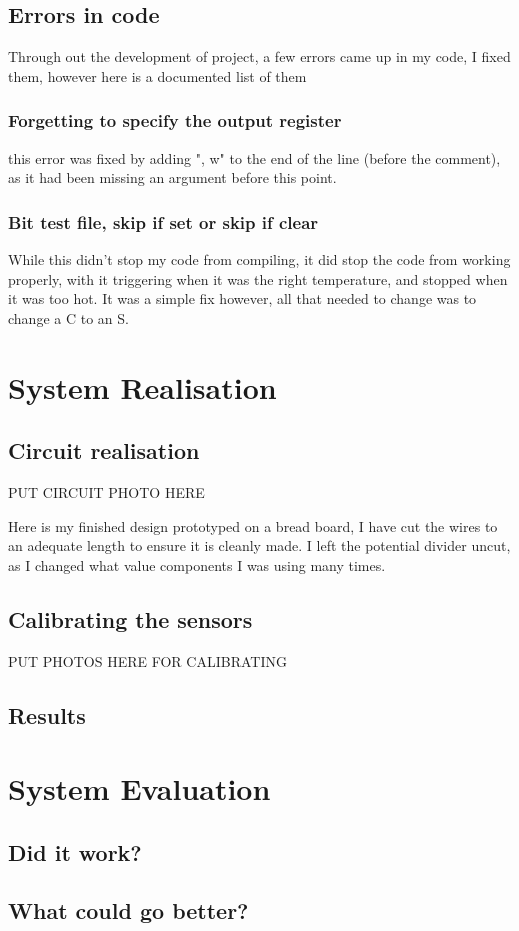 \documentclass[a4paper,12pt]{article}
\begin{document}
{	\subsection{Errors in code}
	Through out the development of project, a few errors came up in my code, I fixed them, however here is a documented
	list of them
	\subsubsection{Forgetting to specify the output register}
	 
	this error was fixed by adding ", w" to the end of the line (before the comment), as it had been missing an argument 
	before this point.
	\subsubsection{Bit test file, skip if set or skip if clear}
	While this didn't stop my code from compiling, it did stop the code from working properly, with it triggering when it
	was the right temperature, and stopped when it was too hot. It was a simple fix however, all that needed to change
	was to change a C to an S.

	\section{System Realisation} 
	\subsection{Circuit realisation}
	PUT CIRCUIT PHOTO HERE

	Here is my finished design prototyped on a bread board, I have cut the wires to an adequate length to ensure it is cleanly made.
	I left the potential divider uncut, as I changed what value components I was using many times.

	\subsection{Calibrating the sensors} 
	PUT PHOTOS HERE FOR CALIBRATING
	\subsection{Results}

	\section{System Evaluation} 
	\subsection{Did it work?} 
	\subsection{What could go better?}

	\newpage

	\printbibliography 
} 
\end{document}
